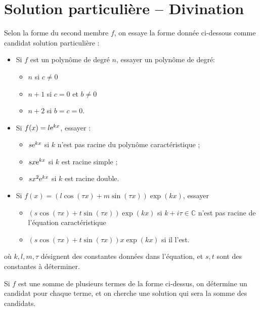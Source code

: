 \documentclass[french,oneside,twocolumn,article]{memoir} %
\newcommand*{\ens}[1]{\mathbb{#1}} %
\newcommand{\CC}{\ens C}%
\begin{document}
\section{Solution particulière -- Divination}
Selon la forme du second membre $f$, on essaye la forme donnée ci-dessous comme candidat \og solution particulière\fg{} :
\begin{itemize}
\item Si $f$ est un polynôme de degré $n$, essayer un polynôme de degré:
  \begin{itemize}
  \item $n$ si $c \neq 0$
  \item $n+1$ si $c = 0$ et $b \neq 0$
  \item $n+2$ si $b = c = 0$.
  \end{itemize}
\item Si $f(x) = l \textup{e}^{kx}$, essayer :
  \begin{itemize}
  \item $s \textup{e}^{kx}$ si $k$ n'est pas racine du polynôme caractéristique ;
  \item $s x \textup{e}^{kx}$ si $k$ est racine simple ;
  \item $s x^{2} \textup{e}^{kx}$ si $k$ est racine double.
  \end{itemize}
\item Si $f(x) = (l \cos(\tau x) + m \sin (\tau x)) \exp(k x)$, essayer
  \begin{itemize}
  \item $(s \cos(\tau x) + t \sin (\tau x)) \exp(k x)$ si $k + i \tau \in \CC$ n'est pas racine de l'équation caractéristique

    
  \item $(s \cos(\tau x) + t \sin (\tau x)) x \exp(k x)$ si il l'est.
  \end{itemize}
\end{itemize}
où $k,l,m,\tau$ désignent des constantes données dans l'équation, et $s,t$ sont des constantes à déterminer.

Si $f$ est une somme de plusieurs termes de la forme ci-dessus, on détermine un candidat pour chaque terme, et on cherche une solution qui sera la somme des candidats.
\end{document}
